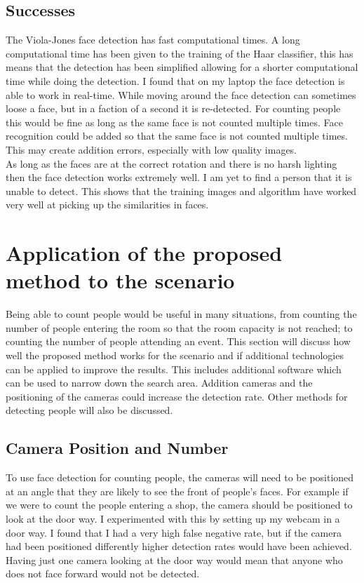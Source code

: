 \documentclass[10pt,a4paper,openbib]{article}
\begin{document}
\begin{multicols}{2}
\subsection{Successes}
The Viola-Jones face detection has fast computational times. A long computational time has been given to the training of the Haar classifier, this has means that the detection has been simplified allowing for a shorter computational time while doing the detection. I found that on my laptop the face detection is able to work in real-time. While moving around the face detection can sometimes loose a face, but in a faction of a second it is re-detected. For counting people this would be fine as long as the same face is not counted multiple times. Face recognition could be added so that the same face is not counted multiple times. This may create addition errors, especially with low quality images.\\

\noindent As long as the faces are at the correct rotation and there is no harsh lighting then the face detection works extremely well. I am yet to find a person that it is unable to detect. This shows that the training images and algorithm have worked very well at picking up the similarities in faces. 

\section{Application of the proposed method to the scenario}
Being able to count people would be useful in many situations, from counting the number of people entering the room so that the room capacity is not reached; to counting the number of people attending an event. This section will discuss how well the proposed method works for the scenario and if additional technologies can be applied to improve the results. This includes additional software which can be used to narrow down the search area. Addition cameras and the positioning of the cameras could increase the detection rate. Other methods for detecting people will also be discussed.

\subsection{Camera Position and Number}
To use face detection for counting people, the cameras will need to be positioned at an angle that they are likely to see the front of people's faces. For example if we were to count the people entering a shop, the camera should be positioned to look at the door way. I experimented with this by setting up my webcam in a door way. I found that I had a very high false negative rate, but if the camera had been positioned differently higher detection rates would have been achieved. Having just one camera looking at the door way would mean that anyone who does not face forward would not be detected. \\


\end{multicols}
\end{document}
